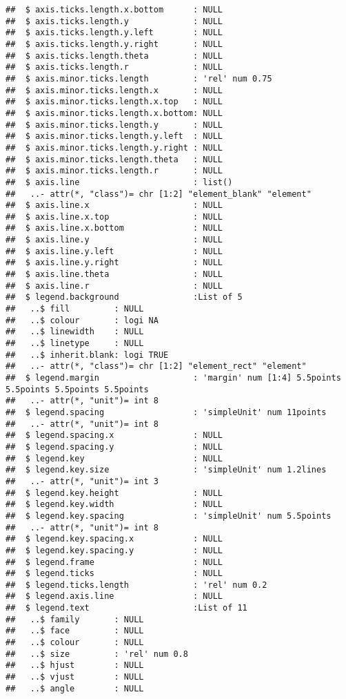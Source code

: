 \documentclass[
]{article}
\begin{document}
\begin{verbatim}
##  $ axis.ticks.length.x.bottom      : NULL
##  $ axis.ticks.length.y             : NULL
##  $ axis.ticks.length.y.left        : NULL
##  $ axis.ticks.length.y.right       : NULL
##  $ axis.ticks.length.theta         : NULL
##  $ axis.ticks.length.r             : NULL
##  $ axis.minor.ticks.length         : 'rel' num 0.75
##  $ axis.minor.ticks.length.x       : NULL
##  $ axis.minor.ticks.length.x.top   : NULL
##  $ axis.minor.ticks.length.x.bottom: NULL
##  $ axis.minor.ticks.length.y       : NULL
##  $ axis.minor.ticks.length.y.left  : NULL
##  $ axis.minor.ticks.length.y.right : NULL
##  $ axis.minor.ticks.length.theta   : NULL
##  $ axis.minor.ticks.length.r       : NULL
##  $ axis.line                       : list()
##   ..- attr(*, "class")= chr [1:2] "element_blank" "element"
##  $ axis.line.x                     : NULL
##  $ axis.line.x.top                 : NULL
##  $ axis.line.x.bottom              : NULL
##  $ axis.line.y                     : NULL
##  $ axis.line.y.left                : NULL
##  $ axis.line.y.right               : NULL
##  $ axis.line.theta                 : NULL
##  $ axis.line.r                     : NULL
##  $ legend.background               :List of 5
##   ..$ fill         : NULL
##   ..$ colour       : logi NA
##   ..$ linewidth    : NULL
##   ..$ linetype     : NULL
##   ..$ inherit.blank: logi TRUE
##   ..- attr(*, "class")= chr [1:2] "element_rect" "element"
##  $ legend.margin                   : 'margin' num [1:4] 5.5points 5.5points 5.5points 5.5points
##   ..- attr(*, "unit")= int 8
##  $ legend.spacing                  : 'simpleUnit' num 11points
##   ..- attr(*, "unit")= int 8
##  $ legend.spacing.x                : NULL
##  $ legend.spacing.y                : NULL
##  $ legend.key                      : NULL
##  $ legend.key.size                 : 'simpleUnit' num 1.2lines
##   ..- attr(*, "unit")= int 3
##  $ legend.key.height               : NULL
##  $ legend.key.width                : NULL
##  $ legend.key.spacing              : 'simpleUnit' num 5.5points
##   ..- attr(*, "unit")= int 8
##  $ legend.key.spacing.x            : NULL
##  $ legend.key.spacing.y            : NULL
##  $ legend.frame                    : NULL
##  $ legend.ticks                    : NULL
##  $ legend.ticks.length             : 'rel' num 0.2
##  $ legend.axis.line                : NULL
##  $ legend.text                     :List of 11
##   ..$ family       : NULL
##   ..$ face         : NULL
##   ..$ colour       : NULL
##   ..$ size         : 'rel' num 0.8
##   ..$ hjust        : NULL
##   ..$ vjust        : NULL
##   ..$ angle        : NULL

\end{verbatim}
\end{document}
